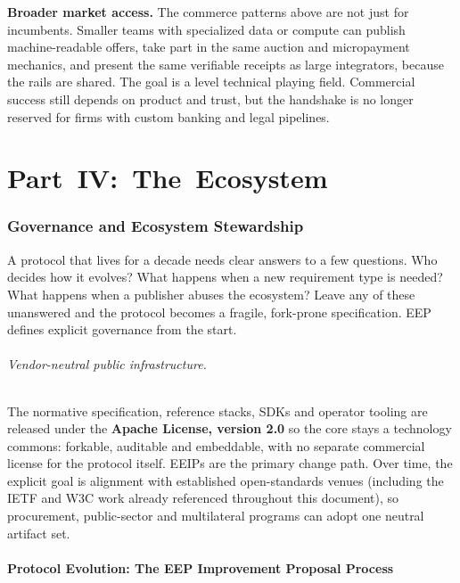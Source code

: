 \documentclass[12pt,a4paper]{article}
\begin{document}
\medskip
\noindent\textbf{Broader market access.}
The commerce patterns above are not just for incumbents. Smaller teams with specialized data or compute can publish machine-readable offers, take part in the same auction and micropayment mechanics, and present the same verifiable receipts as large integrators, because the rails are shared. The goal is a level technical playing field. Commercial success still depends on product and trust, but the handshake is no longer reserved for firms with custom banking and legal pipelines.

\part*{Part~IV:~The~Ecosystem}
\section{Governance and Ecosystem Stewardship}

A protocol that lives for a decade needs clear answers to a few questions. Who decides how it evolves? What happens when a new requirement type is needed? What happens when a publisher abuses the ecosystem? Leave any of these unanswered and the protocol becomes a fragile, fork-prone specification. EEP defines explicit governance from the start.

\paragraph{Vendor-neutral public infrastructure.}
The normative specification, reference stacks, SDKs and operator tooling are released under the \textbf{Apache License, version 2.0} so the core stays a technology commons: forkable, auditable and embeddable, with no separate commercial license for the protocol itself. EEIPs are the primary change path. Over time, the explicit goal is alignment with established open-standards venues (including the IETF and W3C work already referenced throughout this document), so procurement, public-sector and multilateral programs can adopt one neutral artifact set.

\subsection{Protocol Evolution: The EEP Improvement Proposal Process}
\end{document}
